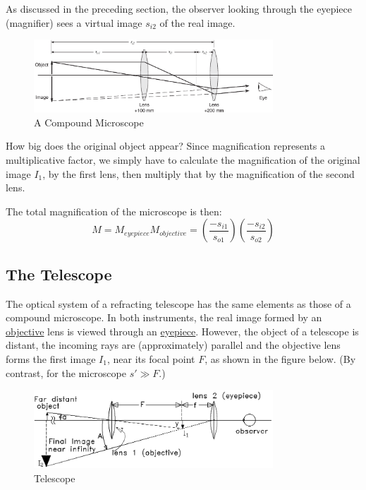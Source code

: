As discussed in the preceding section, the observer looking through the eyepiece (magnifier) sees a virtual image $s_{i2}$ of the real image.
\begin{figure}[h]
\centering
\includegraphics[width=0.8\textwidth]{./Exp7/pic/image9a.png}
\caption{A Compound Microscope}
\label{fig:micro1}
\end{figure}

How big does the original object appear? Since magnification represents a multiplicative factor, we simply have to calculate the magnification of the original image $I_1$, by the first lens, then multiply that by the magnification of the second lens. \myskip

The total magnification of the microscope is then:
\begin{equation}
	M=M_{eyepiece}M_{objective} =  \left(\frac{-s_{i1}}{s_{o1}}\right) \left(\frac{-s_{i2}}{s_{o2}}\right)
\end{equation}

\subsection{The Telescope}
\label{sec:telescope}
The optical system of a refracting telescope has the same elements as those of a compound microscope. In both instruments, the real image formed by an \underline{objective} lens is viewed through an \underline{eyepiece}. However, the object of a telescope is distant, the incoming rays are (approximately) parallel and the objective lens forms the first image $I_1$, near its focal point $F$, as shown in the figure below. (By contrast, for the microscope $s'\gg F$.)\myskip
\begin{figure}[h]
\centering
\includegraphics[width=0.8\textwidth]{./Exp7/pic/image4.png}
\caption{Telescope}
\end{figure}

